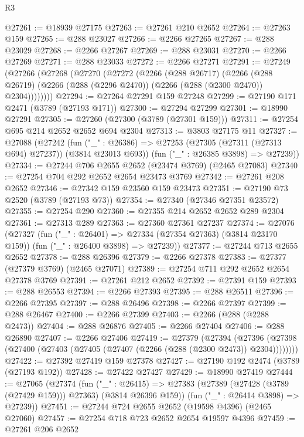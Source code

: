 \begin{lexlean}{R3}
\begin{coremodule}
@27261 := @18939 @27175
@27263 := @27261 @210 @2652
@27264 := @27263 @159
@27265 := @288 @23027
@27266 := @2266 @27265
@27267 := @288 @23029
@27268 := @2266 @27267
@27269 := @288 @23031
@27270 := @2266 @27269
@27271 := @288 @23033
@27272 := @2266 @27271
@27291 := @27249
    (@27266
      (@27268
        (@27270
          (@27272
            (@2266
              (@288 @26717)
              (@2266
                (@288 @26719)
                (@2266 (@288 (@2296 @2470)) (@2266 (@288 (@2300 @2470)) @2304))))))))
@27294 := @27264 @27291 @159 @27248
@27299 := @27190 @171 @2471 (@3789 (@27193 @171))
@27300 := @27294 @27299
@27301 := @18990 @27291
@27305 := @27260 (@27300 (@3789 (@27301 @159)))
@27311 := @27254 @695 @214 @2652 @2652 @694 @2304
@27313 := @3803 @27175 @11
@27327 := @27088
    (@27242
      (fun ("_" : @26386) => @27253 (@27305 (@27311 (@27313 @694) @27237)) (@3814 @23013 @693))
      (fun ("_" : @26385 @3898) => @27239))
@27334 := @27244 @706 @2655 @2652 (@23474 @3769) (@2465 @27083)
@27340 := @27254 @704 @292 @2652 @2654 @23473 @3769
@27342 := @27261 @208 @2652
@27346 := @27342 @159 @23560 @159 @23473
@27351 := @27190 @73 @2520 (@3789 (@27193 @73))
@27354 := @27340 (@27346 @27351 @23572)
@27355 := @27254 @290
@27360 := @27355 @214 @2652 @2652 @289 @2304
@27361 := @27313 @289
@27363 := @27360 @27361 @27237
@27374 := @27076
    (@27327
      (fun ("_" : @26401) => @27334 (@27354 @27363) (@3814 @23170 @159))
      (fun ("_" : @26400 @3898) => @27239))
@27377 := @27244 @713 @2655 @2652
@27378 := @288 @26396
@27379 := @2266 @27378
@27383 := @27377 (@27379 @3769) (@2465 @27071)
@27389 := @27254 @711 @292 @2652 @2654 @27378 @3769
@27391 := @27261 @212 @2652
@27392 := @27391 @159
@27393 := @288 @26553
@27394 := @2266 @27393
@27395 := @288 @26511
@27396 := @2266 @27395
@27397 := @288 @26496
@27398 := @2266 @27397
@27399 := @288 @26467
@27400 := @2266 @27399
@27403 := @2266 (@288 (@2288 @2473))
@27404 := @288 @26876
@27405 := @2266 @27404
@27406 := @288 @26890
@27407 := @2266 @27406
@27419 := @27379
    (@27394
      (@27396 (@27398 (@27400 (@27403 (@27405 (@27407 (@2266 (@288 (@2300 @2473)) @2304))))))))
@27422 := @27392 @27419 @159 @27378
@27427 := @27190 @192 @2474 (@3789 (@27193 @192))
@27428 := @27422 @27427
@27429 := @18990 @27419
@27444 := @27065
    (@27374
      (fun ("_" : @26415) =>
      @27383 (@27389 (@27428 (@3789 (@27429 @159))) @27363) (@3814 @26396 @159))
      (fun ("_" : @26414 @3898) => @27239))
@27451 := @27244 @724 @2655 @2652 (@19598 @4396) (@2465 @27060)
@27457 := @27254 @718 @723 @2652 @2654 @19597 @4396
@27459 := @27261 @206 @2652

\end{coremodule}
\end{lexlean}
